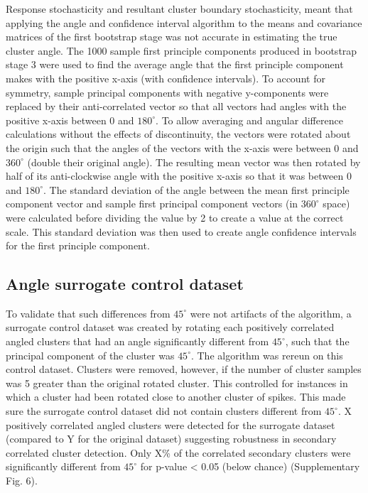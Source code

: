 \documentclass{article}
\begin{document}
Response stochasticity and resultant cluster boundary stochasticity, meant that applying the angle and confidence interval algorithm to the means and covariance matrices of the first bootstrap stage was not accurate in estimating the true cluster angle. The 1000 sample first principle components produced in bootstrap stage 3 were used to find the average angle that the first principle component makes with the positive x-axis (with confidence intervals). To account for symmetry, sample principal components with negative y-components were replaced by their anti-correlated vector so that all vectors had angles with the positive x-axis between 0 and $180^{\circ}$. To allow averaging and angular difference calculations without the effects of discontinuity, the vectors were rotated about the origin such that the angles of the vectors with the x-axis were between 0 and $360^{\circ}$ (double their original angle). The resulting mean vector was then rotated by half of its anti-clockwise angle with the positive x-axis so that it was between 0 and $180^{\circ}$. The standard deviation of the angle between the mean first principle component vector and sample first principal component vectors (in $360^{\circ}$ space) were calculated before dividing the value by 2 to create a value at the correct scale. This standard deviation was then used to create angle confidence intervals for the first principle component. 


\subsection{Angle surrogate control dataset}
\label{methods:angle_surrogate_control_dataset}

To validate that such differences from $45^{\circ}$ were not artifacts of the algorithm, a surrogate control dataset was created by rotating each positively correlated angled clusters that had an angle significantly different from $45^{\circ}$, such that the principal component of the cluster was $45^{\circ}$. The algorithm was rereun on this control dataset. Clusters were removed, however, if the number of cluster samples was 5 greater than the original rotated cluster. This controlled for instances in which a cluster had been rotated close to another cluster of spikes. This made sure the surrogate control dataset did not contain clusters different from $45^{\circ}$. X positively correlated angled clusters were detected for the surrogate dataset (compared to Y for the original dataset) suggesting robustness in secondary correlated cluster detection. Only X\% of the correlated secondary clusters were significantly different from $45^{\circ}$ for p-value < 0.05 (below chance) (Supplementary Fig. 6). 
\end{document}
